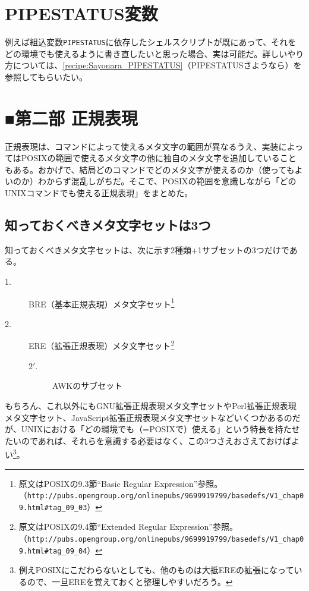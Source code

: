\section{PIPESTATUS変数}

例えば組込変数\verb|PIPESTATUS|に依存したシェルスクリプトが既にあって、それをどの環境でも使えるように書き直したいと思った場合、実は可能だ。詳しいやり方については、\ref{recipe:Sayonara_PIPESTATUS}（PIPESTATUSさようなら）を参照してもらいたい。

\section*{■第二部 正規表現}

正規表現は、コマンドによって使えるメタ文字の範囲が異なるうえ、実装によってはPOSIXの範囲で使えるメタ文字の他に独自のメタ文字を追加していることもある。おかげで、結局どのコマンドでどのメタ文字が使えるのか（使ってもよいのか）わからず混乱しがちだ。そこで、POSIXの範囲を意識しながら「どのUNIXコマンドでも使える正規表現」をまとめた。

\subsection*{知っておくべきメタ文字セットは3つ}

知っておくべきメタ文字セットは、次に示す2種類+1サブセットの3つだけである。
\begin{description}
  \item[1.] BRE（基本正規表現）メタ文字セット\footnote{原文はPOSIXの9.3節``Basic Regular Expression''参照。\\（\verb|http://pubs.opengroup.org/onlinepubs/9699919799/basedefs/V1_chap09.html#tag_09_03|）}
  \item[2.] ERE（拡張正規表現）メタ文字セット\footnote{原文はPOSIXの9.4節``Extended Regular Expression''参照。\\（\verb|http://pubs.opengroup.org/onlinepubs/9699919799/basedefs/V1_chap09.html#tag_09_04|）}
    \begin{description}
      \item[$2\prime$.] AWKのサブセット
     \end{description}
\end{description}
もちろん、これ以外にもGNU拡張正規表現メタ文字セットやPerl拡張正規表現メタ文字セット、JavaScript拡張正規表現メタ文字セットなどいくつかあるのだが、UNIXにおける「どの環境でも（=POSIXで）使える」という特長を持たせたいのであれば、それらを意識する必要はなく、この3つさえおさえておけばよい\footnote{例えPOSIXにこだわらないとしても、他のものは大抵EREの拡張になっているので、一旦EREを覚えておくと整理しやすいだろう。}。

